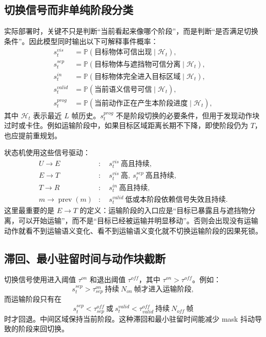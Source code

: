 \documentclass[UTF8,a4paper,11pt]{ctexart}
\newcommand{\Prob}{\mathbb{P}}
\begin{document}
\subsection{切换信号而非单纯阶段分类}

实际部署时，关键不只是判断“当前看起来像哪个阶段”，而是判断“是否满足切换条件”。因此模型同时输出以下可解释事件概率：
\begin{align}
s_t^{vis} &= \Prob(\text{目标物体可信出现}\mid \mathcal H_t),\\
s_t^{sep} &= \Prob(\text{目标物体与遮挡物可信分离}\mid \mathcal H_t),\\
s_t^{in} &= \Prob(\text{目标物体完全进入目标区域}\mid \mathcal H_t),\\
s_t^{valid} &= \Prob(\text{当前语义信号可信}\mid \mathcal H_t),\\
s_t^{prog} &= \Prob(\text{当前动作正在产生本阶段进度}\mid \mathcal H_t),
\end{align}
其中 $\mathcal H_t$ 表示最近 $L$ 帧历史。$s_t^{prog}$ 不是阶段切换的必要条件，但用于发现动作块过时或卡住。例如运输阶段中，如果目标区域距离长期不下降，即使阶段仍为 $T$，也应提前重规划。

状态机使用这些信号驱动：
\begin{align}
U\rightarrow E &:\quad s_t^{vis}\ \text{高且持续},\\
E\rightarrow T &:\quad s_t^{vis}\ \text{高},\ s_t^{sep}\ \text{高且持续},\\
T\rightarrow R &:\quad s_t^{in}\ \text{高且持续},\\
m\rightarrow \operatorname{prev}(m) &:\quad s_t^{valid}\ \text{低或本阶段依赖信号失效且持续}.
\end{align}
这里最重要的是 $E\rightarrow T$ 的定义：运输阶段的入口应是“目标已暴露且与遮挡物分离，可以开始运输”，而不是“目标已经被运输并明显移动”。否则会出现没有运输动作就看不到运输语义变化、看不到运输语义变化就不切换运输阶段的因果死锁。

\subsection{滞回、最小驻留时间与动作块截断}

切换信号使用进入阈值 $\tau^{on}$ 和退出阈值 $\tau^{off}$，其中 $\tau^{on}>\tau^{off}$。例如：
\begin{equation}
s_t^{sep}>\tau_{sep}^{on}\ \text{持续}\ N_{on}\ \text{帧才进入运输阶段},
\end{equation}
而运输阶段只有在
\begin{equation}
s_t^{sep}<\tau_{sep}^{off}\ \text{或}\ s_t^{valid}<\tau_{valid}^{off}
\ \text{持续}\ N_{off}\ \text{帧}
\end{equation}
时才回退。中间区域保持当前阶段。这种滞回和最小驻留时间能减少 mask 抖动导致的阶段来回切换。
\end{document}
